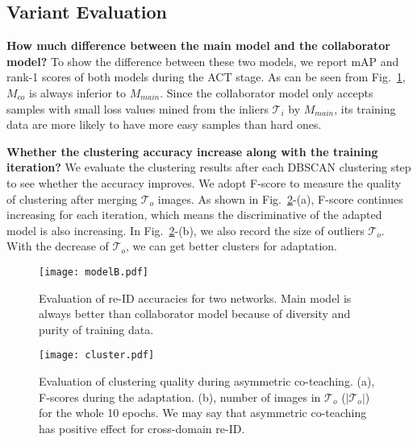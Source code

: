 \documentclass[letterpaper]{article} \usepackage{aaai20}  \usepackage{times}  \usepackage{helvet} \usepackage{courier}  \usepackage[hyphens]{url}  \usepackage{graphicx} \urlstyle{rm} \def\UrlFont{\rm}  \usepackage{graphicx}  \frenchspacing  \setlength{\pdfpagewidth}{8.5in}  \setlength{\pdfpageheight}{11in}  \usepackage{color}
\begin{document}
\subsection{Variant Evaluation}


\textbf{How much difference between the main model and the collaborator model?}
To show the difference between these two models, we report mAP and rank-1 scores of both models during the ACT stage. As can be seen from Fig.~\ref{fig:modelB}, $M_{co}$ is always inferior to $M_{main}$. Since the collaborator model only accepts samples with small loss values mined from the inliers $\mathcal{T}_i$ by $M_{main}$, its training data are more likely to have more easy samples than hard ones.


\textbf{Whether the clustering accuracy increase along with the training iteration?}
We evaluate the clustering results after each DBSCAN clustering step to see whether the accuracy improves. We adopt F-score to measure the quality of clustering after merging $\mathcal{T}_{o}$ images. As shown in Fig.~\ref{fig:cluster}-(a), F-score continues increasing for each iteration, which means the discriminative of the adapted model is also increasing. In Fig.~\ref{fig:cluster}-(b), we also record the size of outliers $\mathcal{T}_{o}$. With the decrease of $\mathcal{T}_{o}$, we can get better clusters for adaptation.


\begin{figure}[!t]
  \centering
  \texttt{[image: modelB.pdf]}
  \caption{Evaluation of re-ID accuracies for two networks. Main model is always better than collaborator model because of diversity and purity of training data.}
  \label{fig:modelB}
\end{figure}
\begin{figure}[!t]
  \centering
  \texttt{[image: cluster.pdf]}
  \caption{Evaluation of clustering quality during asymmetric co-teaching. (a), F-scores during the adaptation. (b), number of images in $\mathcal{T}_{o}$ ($|\mathcal{T}_{o}|$) for the whole 10 epochs. We may say that asymmetric co-teaching has positive effect for cross-domain re-ID.}
  \label{fig:cluster}
\end{figure}
\end{document}
